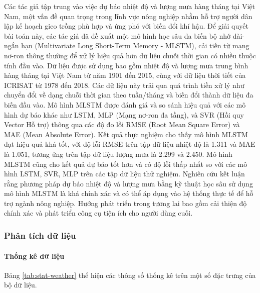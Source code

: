     Các tác giả \cite{Dng2022} tập trung vào việc dự báo nhiệt độ và lượng mưa hàng tháng tại Việt Nam, một vấn đề quan trọng trong lĩnh vực nông nghiệp nhằm hỗ trợ người dân lập kế hoạch gieo trồng phù hợp và ứng phó với biến đổi khí hậu. Để giải quyết bài toán này, các tác giả đã đề xuất một mô hình học sâu đa biến bộ nhớ dài-ngắn hạn (Multivariate Long Short-Term Memory - MLSTM), cải tiến từ mạng nơ-ron thông thường để xử lý hiệu quả hơn dữ liệu chuỗi thời gian có nhiều thuộc tính đầu vào. Dữ liệu được sử dụng bao gồm nhiệt độ và lượng mưa trung bình hàng tháng tại Việt Nam từ năm 1901 đến 2015, cùng với dữ liệu thời tiết của ICRISAT từ 1978 đến 2018. Các dữ liệu này trải qua quá trình tiền xử lý như chuyển đổi về dạng chuỗi thời gian theo tuần/tháng và biến đổi thành dữ liệu đa biến đầu vào. Mô hình MLSTM được đánh giá và so sánh hiệu quả với các mô hình dự báo khác như LSTM, MLP (Mạng nơ-ron đa tầng), và SVR (Hồi quy Vector Hỗ trợ) thông qua các độ đo lỗi RMSE (Root Mean Square Error) và MAE (Mean Absolute Error). Kết quả thực nghiệm cho thấy mô hình MLSTM đạt hiệu quả khá tốt, với độ lỗi RMSE trên tập dữ liệu nhiệt độ là 1.311 và MAE là 1.051, tương ứng trên tập dữ liệu lượng mưa là 2.299 và 2.450. Mô hình MLSTM cũng cho kết quả dự báo tốt hơn và có độ lỗi thấp nhất so với các mô hình LSTM, SVR, MLP trên các tập dữ liệu thử nghiệm. Nghiên cứu kết luận rằng phương pháp dự báo nhiệt độ và lượng mưa bằng kỹ thuật học sâu sử dụng mô hình MLSTM là khá chính xác và có thể áp dụng vào hệ thống thực tế để hỗ trợ ngành nông nghiệp. Hướng phát triển trong tương lai bao gồm cải thiện độ chính xác và phát triển công cụ tiện ích cho người dùng cuối.


\subsubsection{Phân tích dữ liệu}
    \paragraph{Thống kê dữ liệu}
        \leavevmode

    Bảng \ref{tab:stat-weather} thể hiện các thông số thống kê trên một số đặc trưng của bộ dữ liệu.

